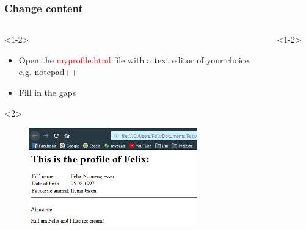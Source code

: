 \documentclass[aspectratio=169]{beamer}
\begin{document}
\begin{frame}
\frametitle{Change content}

\begin{columns}[T]
	\begin{column}{0.6\textwidth}
		\begin{block}{}<1-2>
			\begin{itemize}
				\item Open the \textcolor{red}{myprofile.html} file with a text editor of your choice. e.g. notepad++
				\item Fill in the gaps
			\end{itemize}
		\end{block}
		\begin{block}{}<2>
			\begin{figure}
				\includegraphics[width= 0.8\textwidth]{graphics/profile.png}
			\end{figure}
		\end{block}
	\end{column}
	\begin{column}{0.4\textwidth}
		\begin{block}{}<1-2>
			\begin{figure}

\end{figure}
\end{block}
\end{column}
\end{columns}
\end{frame}
\end{document}
